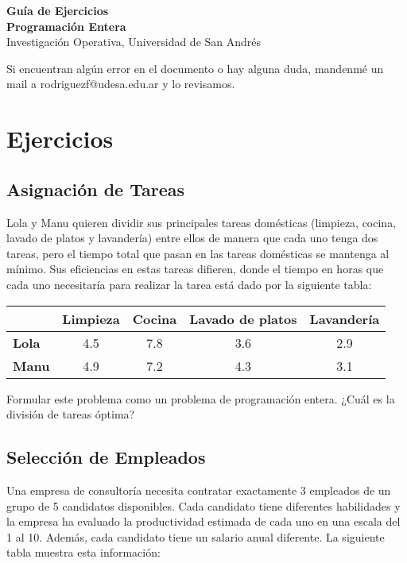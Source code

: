 \documentclass[12pt]{article}
\begin{document}
\begin{center}
    {\LARGE \textbf{Guía de Ejercicios \\Programación Entera}}\\[0.5em]
    {Investigación Operativa, Universidad de San Andrés}
\end{center}

Si encuentran algún error en el documento o hay alguna duda, mandenmé un mail a rodriguezf@udesa.edu.ar y lo revisamos.

\section{Ejercicios}

\subsection{Asignación de Tareas}
Lola y Manu quieren dividir sus principales tareas domésticas (limpieza, cocina, lavado de platos y lavandería) entre ellos de manera que cada uno tenga dos tareas, pero el tiempo total que pasan en las tareas domésticas se mantenga al mínimo. Sus eficiencias en estas tareas difieren, donde el tiempo en horas que cada uno necesitaría para realizar la tarea está dado por la siguiente tabla:

\begin{table}[h]
\centering
\begin{tabular}{lcccc}
\toprule
& \textbf{Limpieza} & \textbf{Cocina} & \textbf{Lavado de platos} & \textbf{Lavandería} \\
\midrule
\textbf{Lola} & 4.5 & 7.8 & 3.6 & 2.9 \\
\textbf{Manu} & 4.9 & 7.2 & 4.3 & 3.1 \\
\bottomrule
\end{tabular}
\end{table}

Formular este problema como un problema de programación entera. ¿Cuál es la división de tareas óptima?

\subsection{Selección de Empleados}
Una empresa de consultoría necesita contratar exactamente 3 empleados de un grupo de 5 candidatos disponibles. Cada candidato tiene diferentes habilidades y la empresa ha evaluado la productividad estimada de cada uno en una escala del 1 al 10. Además, cada candidato tiene un salario anual diferente. La siguiente tabla muestra esta información:
\end{document}
